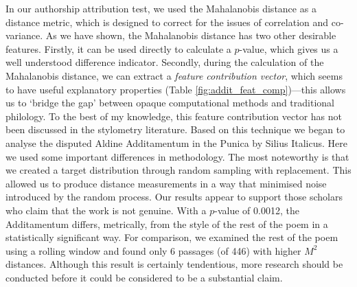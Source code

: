 \documentclass[11pt,a4paper]{scrartcl} %
\begin{document}
In our authorship attribution test, we used the Mahalanobis distance as a distance metric, which is designed to correct for the issues of correlation and co-variance. As we have shown, the Mahalanobis distance has two other desirable features. Firstly, it can be used directly to calculate a $p$-value, which gives us a well understood difference indicator. Secondly, during the calculation of the Mahalanobis distance, we can extract a \textit{feature contribution vector}, which seems to have useful explanatory properties (Table \ref{fig:addit_feat_comp})---this allows us to `bridge the gap' between opaque computational methods and traditional philology. To the best of my knowledge, this feature contribution vector has not been discussed in the stylometry literature. Based on this technique we began to analyse the disputed Aldine Additamentum in the Punica by Silius Italicus. Here we used some important differences in methodology. The most noteworthy is that we created a target distribution through random sampling with replacement. This allowed us to produce distance measurements in a way that minimised noise introduced by the random process. Our results appear to support those scholars who claim that the work is not genuine. With a $p$-value of 0.0012, the Additamentum differs, metrically, from the style of the rest of the poem in a statistically significant way. For comparison, we examined the rest of the poem using a rolling window and found only 6 passages (of 446) with higher $M^{2}$ distances. Although this result is certainly tendentious, more research should be conducted before it could be considered to be a substantial claim.
\newpage
\end{document}
